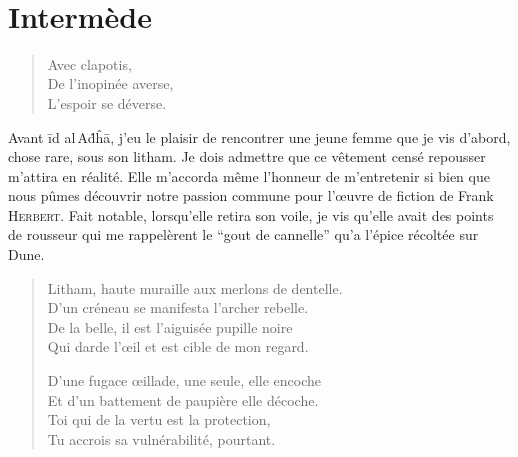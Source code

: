 \newpage{}
\thispagestyle{empty}
~
\vfill
\pagebreak

\section*{Intermède}

\begin{verse}\haiku
  Avec clapotis,\\  %
  De l’inopinée averse,\\  %
  L’espoir se déverse.
\end{verse}


\begin{prose}
  Avant īd al\,Aḋĥā, j’eu le plaisir de rencontrer une jeune femme que je vis d’abord, chose rare, sous son litham. Je dois admettre que ce vêtement censé repousser m’attira en réalité. Elle m’accorda même l’honneur de m’entretenir si bien que nous pûmes découvrir notre passion commune pour l’œuvre de fiction de Frank \textsc{Herbert}. Fait notable, lorsqu’elle retira son voile, je vis qu’elle avait des points de rousseur qui me rappelèrent le \enquote{gout de cannelle} qu’a l’épice récoltée sur Dune.
\end{prose}

\begin{verse}\quatrain
  Litham, haute muraille aux merlons de dentelle.\\  %
  D’un créneau se manifesta l’archer rebelle.\\   %
  De la belle, il est l’aiguisée pupille noire\\   %
  Qui darde l’œil et est cible de mon regard. 

  D’une fugace œillade, une seule, elle encoche\\   %
  Et d’un battement de paupière elle décoche.\\   %
  Toi qui de la vertu est la protection,\\   %
  Tu accrois sa vulnérabilité, pourtant. 
\end{verse}



